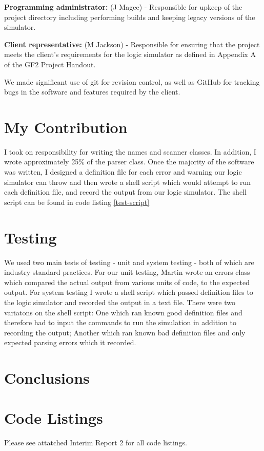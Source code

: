 \documentclass[a4paper,10pt]{article}
\begin{document}
\textbf{Programming administrator:} (J Magee) - Responsible for upkeep of the project directory including performing builds and keeping legacy versions of the simulator.

\textbf{Client representative:} (M Jackson) - Responsible for ensuring that the project meets the client's requirements for the logic simulator as defined in Appendix A of the GF2 Project Handout.

We made significant use of git for revision control, as well as GitHub for tracking bugs in the software and features required by the client.

\section{My Contribution}

I took on responsibility for writing the names and scanner classes. In addition, I wrote approximately 25\% of the parser class. Once the majority of the software was written, I designed a definition file for each error and warning our logic simulator can throw and then wrote a shell script which would attempt to run each definition file, and record the output from our logic simulator. The shell script can be found in code listing \ref{test-script}

\section{Testing}

We used two main tests of testing - unit and system testing - both of which are industry standard practices. For our unit testing, Martin wrote an errors class which compared the actual output from various units of code, to the expected output. For system testing I wrote a shell script which passed definition files to the logic simulator and recorded the output in a text file. There were two variatons on the shell script: One which ran known good definition files and therefore had to input the commands to run the simulation in addition to recording the output; Another which ran known bad definition files and only expected parsing errors which it recorded.

\section{Conclusions}

\pagebreak

\appendix
\section{Code Listings}
Please see attatched Interim Report 2 for all code listings.
\end{document}
